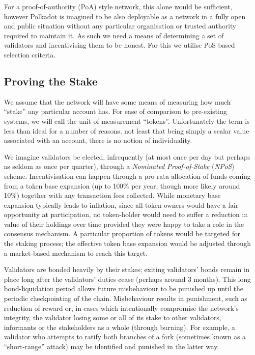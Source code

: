 \documentclass[usepdftitle=false]{beamer}
\begin{document}
\begin{frame}
 For a proof-of-authority (PoA) style network, this alone would be sufficient, however Polkadot is imagined to be also deployable as a network in a fully open and public situation without any particular organisation or trusted authority required to maintain it. As such we need a means of determining a set of validators and incentivising them to be honest. For this we utilise PoS based selection criteria.

\subsection{Proving the Stake}\label{proving-the-stake}

 We assume that the network will have some means of measuring how much ``stake'' any particular account has. For ease of comparison to pre-existing systems, we will call the unit of measurement ``tokens''. Unfortunately the term is less than ideal for a number of reasons, not least that being simply a scalar value associated with an account, there is no notion of individuality.

 We imagine validators be elected, infrequently (at most once per day but perhaps as seldom as once per quarter), through a \textit{Nominated Proof-of-Stake} (\textit{NPoS}) scheme. Incentivisation can happen through a pro-rata allocation of funds coming from a token base expansion (up to 100\% per year, though more likely around 10\%) together with any transaction fees collected. While monetary base expansion typically leads to inflation, since all token owners would have a fair opportunity at participation, no token-holder would need to suffer a reduction in value of their holdings over time provided they were happy to take a role in the consensus mechanism. A particular proportion of tokens would be targeted for the staking process; the effective token base expansion would be adjusted through a market-based mechanism to reach this target.

 Validators are bonded heavily by their stakes; exiting validators' bonds remain in place long after the validators' duties cease (perhaps around 3 months). This long bond-liquidation period allows future misbehaviour to be punished up until the periodic checkpointing of the chain. Misbehaviour results in punishment, such as reduction of reward or, in cases which intentionally compromise the network's integrity, the validator losing some or all of its stake to other validators, informants or the stakeholders as a whole (through burning). For example, a validator who attempts to ratify both branches of a fork (sometimes known as a ``short-range'' attack) may be identified and punished in the latter way.


\end{frame}
\end{document}
